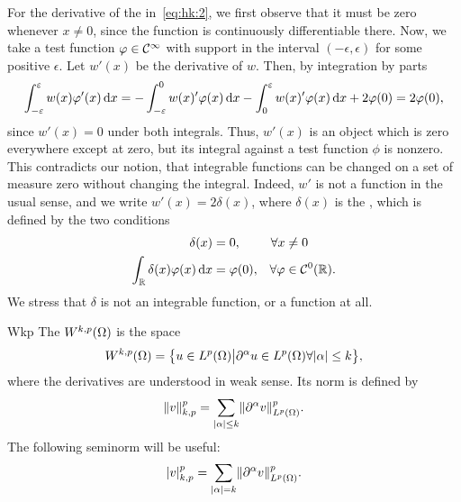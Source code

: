 \begin{example}
  For the derivative of the 
  in~\eqref{eq:hk:2}, we first observe that it must be zero whenever
  $x\neq 0$, since the function is continuously differentiable
  there. Now, we take a test function $\varphi\in\mathcal C^\infty$ with support
  in the interval $(-\epsilon,\epsilon)$ for some positive
  $\epsilon$. Let $w'(x)$ be the derivative of $w$. Then, by
  integration by parts
  \begin{gather*}
    \int_{-\varepsilon}^\varepsilon w(x) \varphi'(x)\,\mathrm{d} x
    = -\int_{-\varepsilon}^0 w(x)' \varphi(x)\,\mathrm{d} x
    -\int_0^\varepsilon w(x)' \varphi(x)\,\mathrm{d} x
    + 2 \varphi(0) = 2\varphi(0),
  \end{gather*}
  since $w'(x) = 0$ under both integrals. Thus, $w'(x)$ is an object
  which is zero everywhere except at zero, but its integral against a
  test function $\phi$ is nonzero. This contradicts our notion, that
  integrable functions can be changed on a set of measure zero without
  changing the integral. Indeed, $w'$ is not a function in the usual
  sense, and we write $w'(x) = 2 \delta(x)$, where $\delta(x)$ is the
  , which is defined by the two
  conditions
  \begin{gather*}
    \begin{alignedat}{2}
      \delta(x) &= 0, & \forall x & \neq 0
      \\
      \int_\mathbb R \delta(x) \varphi(x)\,\mathrm{d} x &= \varphi(0), \quad & \forall \varphi
      &\in \mathcal C^0(\mathbb R).
    \end{alignedat}
  \end{gather*}
  We stress that $\delta$ is not an integrable function, or a function
  at all.
\end{example}

\begin{Definition}{Wkp}
  The  $W^{k,p}(\Omega)$ is the space
  \begin{gather}
    W^{k,p}(\Omega) = \bigl\{
    u\in L^p(\Omega) \big|
    \partial^\alpha u\in L^p(\Omega) \forall \lvert\alpha\rvert \le k
    \bigr\},
  \end{gather}
  where the derivatives are understood in weak sense. Its norm is
  defined by
  \begin{gather}
    \lVert v\rVert_{k,p}^p = \sum_{\lvert\alpha\rvert \le k} \lVert\partial^\alpha v\rVert_{L^p(\Omega)}^p.
  \end{gather}
  The following seminorm will be useful:
  \begin{gather}
    \lvert v\rvert_{k,p}^p = \sum_{\lvert\alpha\rvert = k} \lVert\partial^\alpha v\rVert_{L^p(\Omega)}^p.
  \end{gather}
\end{Definition}

